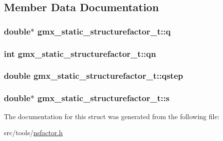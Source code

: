 \subsection{\-Member \-Data \-Documentation}
\hypertarget{structgmx__static__structurefactor__t_a8b798197d96cd9216730620bc6060cd2}{
\subsubsection[{q}]{\setlength{\rightskip}{0pt plus 5cm}double$\ast$ {\bf gmx\-\_\-static\-\_\-structurefactor\-\_\-t\-::q}}}\label{structgmx__static__structurefactor__t_a8b798197d96cd9216730620bc6060cd2}
\hypertarget{structgmx__static__structurefactor__t_a7566e860192c4ded8b690547178b7f75}{
\subsubsection[{qn}]{\setlength{\rightskip}{0pt plus 5cm}int {\bf gmx\-\_\-static\-\_\-structurefactor\-\_\-t\-::qn}}}\label{structgmx__static__structurefactor__t_a7566e860192c4ded8b690547178b7f75}
\hypertarget{structgmx__static__structurefactor__t_a968722b199b96c68e1c96aa5d185bbad}{
\subsubsection[{qstep}]{\setlength{\rightskip}{0pt plus 5cm}double {\bf gmx\-\_\-static\-\_\-structurefactor\-\_\-t\-::qstep}}}\label{structgmx__static__structurefactor__t_a968722b199b96c68e1c96aa5d185bbad}
\hypertarget{structgmx__static__structurefactor__t_a4da0bf63a2046993db8cbb8e071225d6}{
\subsubsection[{s}]{\setlength{\rightskip}{0pt plus 5cm}double$\ast$ {\bf gmx\-\_\-static\-\_\-structurefactor\-\_\-t\-::s}}}\label{structgmx__static__structurefactor__t_a4da0bf63a2046993db8cbb8e071225d6}


\-The documentation for this struct was generated from the following file\-:\begin{DoxyCompactItemize}
\item 
src/tools/\hyperlink{nsfactor_8h}{nsfactor.\-h}\end{DoxyCompactItemize}
